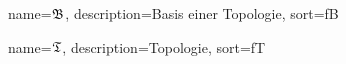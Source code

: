 {
  name={\ensuremath{\fB}},
  description={Basis einer Topologie},
  sort=fB
}

{
  name={\ensuremath{\fT}},
  description={Topologie},
  sort=fT
}


\renewcommand*{\glossaryname}{\glossarName}

\glsaddall
\printglossaries

